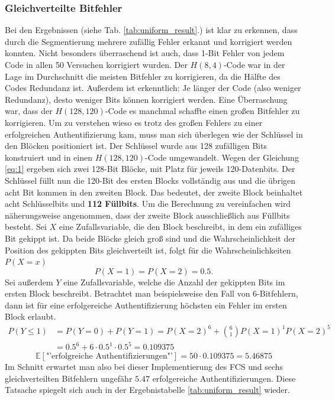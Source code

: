 \documentclass{article}
\begin{document}
    \subsubsection{Gleichverteilte Bitfehler}
    Bei den Ergebnissen (siehe Tab. \ref{tab:uniform_result}.) ist klar zu erkennen, dass durch die Segmentierung 
    mehrere zufällig Fehler erkannt und korrigiert werden konnten.
    Nicht besonders überraschend ist auch, dass 1-Bit Fehler von jedem Code in allen 50 Versuchen korrigiert 
    wurden. Der $H(8,4)$-Code war in der Lage im Durchschnitt die meisten Bitfehler zu korrigieren, da die
    Hälfte des Codes Redundanz ist. Außerdem ist erkenntlich: Je länger der Code (also weniger Redundanz), desto
    weniger Bits können korrigiert werden. Eine Überraschung war, dass der $H(128,120)$-Code es manchmal schaffte
    einen großen Bitfehler zu korrigieren. Um zu verstehen wieso es trotz des großen Fehlers zu einer erfolgreichen
    Authentifizierung kam, muss man sich überlegen wie der Schlüssel in den Blöcken positioniert ist.\newline
    Der Schlüssel wurde aus 128 zufälligen Bits konstruiert und in einen $H(128,120)$-Code umgewandelt.
    Wegen der Gleichung \ref{eq:1} ergeben sich zwei 128-Bit Blöcke, mit Platz für jeweils 120-Datenbits.
    Der Schlüssel füllt nun die 120-Bit des ersten Blocks vollständig aus und die übrigen acht Bit kommen
    in den zweiten Block. Das bedeutet, der zweite Block beinhaltet acht Schlüsselbits und \textbf{112 Füllbits}.
    Um die Berechnung zu vereinfachen wird näherungsweise angenommen, dass der zweite Block ausschließlich aus
    Füllbits besteht. Sei $X$ eine Zufallsvariable, die den Block beschreibt, in dem ein zufälliges Bit 
    gekippt ist. Da beide Blöcke gleich groß sind und die Wahrscheinlichkeit der Position des gekippten Bits
    gleichverteilt ist, folgt für die Wahrscheinlichkeiten $P(X=x)$
    \[
        P(X=1) = P(X=2) = 0.5.
    \]
    Sei außerdem $Y$ eine Zufallsvariable, welche die Anzahl der gekippten Bits im ersten Block beschreibt.
    Betrachtet man beispielsweise den Fall von 6-Bitfehlern, dann ist für eine erfolgereiche Authentifizierung
    höchsten ein Fehler im ersten Block erlaubt.
    \begin{align*}
        P(Y \leq 1) &= P(Y = 0) + P(Y = 1) = P(X=2)^{6} + {6\choose 1}P(X=1)^1P(X=2)^{5}\\
        &=0.5^{6} + 6\cdot 0.5^1 \cdot 0.5^5 = 0.109375
    \end{align*}
    \[
        \mathbb{E}\left[\text{"'erfolgreiche Authentifizierungen"'}\right] =  50 \cdot 0.109375 = 5.46875
    \]
    Im Schnitt erwartet man also bei dieser Implementierung des FCS und sechs gleichverteilten Bitfehlern 
    ungefähr $5.47$ erfolgereiche Authentifizierungen. Diese Tatsache spiegelt sich auch in der Ergebnistabelle 
    \ref{tab:uniform_result} wieder.
\end{document}
